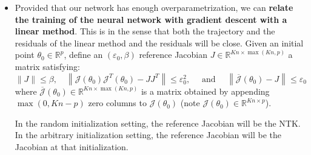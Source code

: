 \documentclass[a4paper]{article}
\let\temp\epsilon
\let\epsilon\varepsilon
\let\varepsilon\temp
\newcommand{\R}{\mathbb{R}}
\begin{document}
\begin{itemize}
    \item Provided that our network has enough overparametrization, we can \textbf{relate the training of the neural network with gradient descent with a linear method}. This is in the sense that both the trajectory and the residuals of the linear method and the residuals will be close. Given an initial point $\theta_0 \in \R^p$, define an $(\epsilon_0, \beta)$ reference Jacobian $J \in \R^{Kn\times \max(Kn,p)}$ a matrix satisfying:
        \[
        \|J\| \leq \beta, \quad\left\|\mathcal{J}\left(\theta_{0}\right) \mathcal{J}^{T}\left(\theta_{0}\right)-J J^{T}\right\| \leq \epsilon_{0}^{2}, \quad \text { and } \quad\left\|\overline{\mathcal{J}}\left(\theta_{0}\right)-J\right\| \leq \epsilon_{0}
        \] 
        where $\overline{\mathcal{J}}(\theta_0) \in \R^{Kn \times \max(Kn,p)}$ is a matrix obtained by appending $\max(0, Kn-p)$ zero columns to $\mathcal{J}(\theta_0)$ (note $\mathcal{J}(\theta_0) \in \R^{Kn\times p}$).

        In the random initialization setting, the reference Jacobian will be the NTK. In the arbitrary initialization setting, the reference Jacobian will be the Jacobian at that initialization.


\end{itemize}
\end{document}
